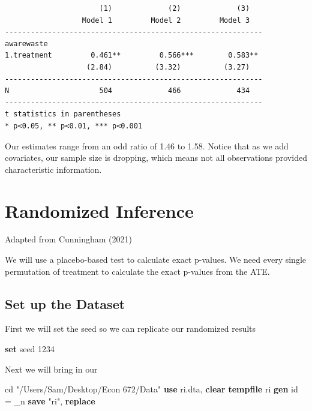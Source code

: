 \documentclass[
]{book}
\newenvironment{Shaded}{\begin{snugshade}}{\end{snugshade}}
\newcommand{\DataTypeTok}[1]{\textcolor[rgb]{0.13,0.29,0.53}{#1}}
\newcommand{\DecValTok}[1]{\textcolor[rgb]{0.00,0.00,0.81}{#1}}
\newcommand{\KeywordTok}[1]{\textcolor[rgb]{0.13,0.29,0.53}{\textbf{#1}}}
\newcommand{\NormalTok}[1]{#1}
\newcommand{\StringTok}[1]{\textcolor[rgb]{0.31,0.60,0.02}{#1}}
\begin{document}
\begin{verbatim}
                      (1)             (2)             (3)   
                  Model 1         Model 2         Model 3   
------------------------------------------------------------
awarewaste                                                  
1.treatment         0.461**         0.566***        0.583** 
                   (2.84)          (3.32)          (3.27)   
------------------------------------------------------------
N                     504             466             434   
------------------------------------------------------------
t statistics in parentheses
* p<0.05, ** p<0.01, *** p<0.001
\end{verbatim}

Our estimates range from an odd ratio of 1.46 to 1.58. Notice that as we add covariates, our sample size is dropping, which means not all observations provided characteristic information.

\chapter{Randomized Inference}\label{randomized-inference}

Adapted from Cunningham (2021)

We will use a placebo-based test to calculate exact p-values. We need every single permutation of treatment to calculate the exact p-values from the ATE.

\section{Set up the Dataset}\label{set-up-the-dataset}

First we will set the seed so we can replicate our randomized results

\begin{Shaded}
\begin{Highlighting}[]
\KeywordTok{set} \DecValTok{seed}\NormalTok{ 1234}
\end{Highlighting}
\end{Shaded}

Next we will bring in our

\begin{Shaded}
\begin{Highlighting}[]
\NormalTok{cd }\StringTok{"/Users/Sam/Desktop/Econ 672/Data"}
\KeywordTok{use}\NormalTok{ ri.dta, }\KeywordTok{clear}
\KeywordTok{tempfile}\NormalTok{ ri}
\KeywordTok{gen}\NormalTok{ id = }\DataTypeTok{\_n}
\KeywordTok{save} \StringTok{"\textasciigrave{}ri\textquotesingle{}"}\NormalTok{, }\KeywordTok{replace}
\end{Highlighting}
\end{Shaded}
\end{document}
